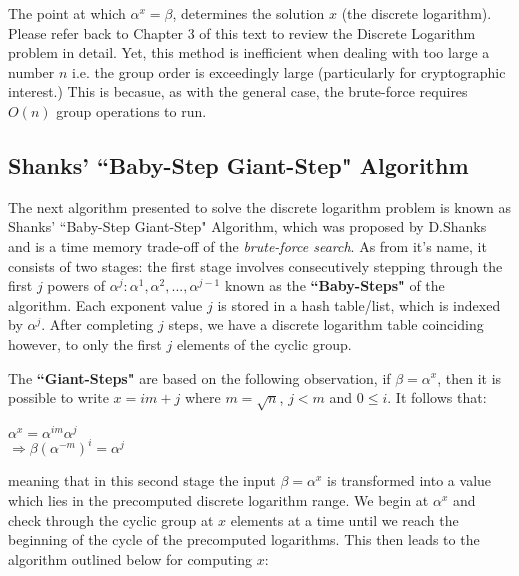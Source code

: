 \documentclass[iwp,first]{luthesis}
\begin{document}
The point at which $\alpha^x = \beta$, determines the solution $x$ (the discrete logarithm). Please refer back to Chapter 3 of this text to review the Discrete Logarithm problem in detail. Yet, this method is inefficient when dealing with too large a number $n$ i.e. the group order is exceedingly large (particularly for cryptographic interest.) This is becasue, as with the general case, the brute-force requires $O(n)$ group operations to run.

\subsection{Shanks' ``Baby-Step Giant-Step" Algorithm}

The next algorithm presented to solve the discrete logarithm problem is known as Shanks' ``Baby-Step Giant-Step" Algorithm, which was proposed by D.Shanks and is a time memory trade-off of the \textit{brute-force search}. As from it's name, it consists of two stages: the first stage involves consecutively stepping through the first $j$ powers of $\alpha^j : \alpha^1, \alpha^2,...,\alpha^{j-1}$ known as the \textbf{``Baby-Steps"} of the algorithm. Each exponent value $j$ is stored in a hash table/list, which is indexed by $\alpha^j$. After completing $j$ steps, we have a discrete logarithm table coinciding however, to only the first $j$ elements of the cyclic group.

The \textbf{``Giant-Steps"} are based on the following observation, if $\beta = \alpha^x$, then it is possible to write $x=im + j$ where $m = \sqrt{n}$, $j<m$ and $0 \leq i$. It follows that:

\begin{center}
$\alpha^x = \alpha^{im}\alpha^j $
\\
$\Rightarrow \beta(\alpha^{-m})^{i} = \alpha^j$
\end{center}

meaning that in this second stage the input $\beta = \alpha^x$ is transformed into a value which lies in the precomputed discrete logarithm range. We begin at $\alpha^x$ and check through the cyclic group at $x$ elements at a time until we reach the beginning of the cycle of the precomputed logarithms. This then leads to the algorithm outlined below for computing $x$:
\end{document}
